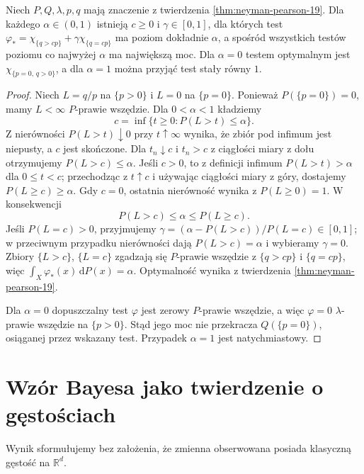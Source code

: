 \begin{wniosek}
\label{cor:NP-exact-alpha-19}
Niech $P,Q,\lambda,p,q$ mają znaczenie z twierdzenia
\ref{thm:neyman-pearson-19}. Dla każdego
$\alpha\in(0,1)$ istnieją $c\ge0$ i
$\gamma\in[0,1]$, dla których test
$\varphi_*=\chi_{\{q>cp\}}+\gamma\chi_{\{q=cp\}}$
ma poziom dokładnie $\alpha$, a spośród wszystkich
testów poziomu co najwyżej $\alpha$ ma największą moc.
Dla $\alpha=0$ testem optymalnym jest
$\chi_{\{p=0,\,q>0\}}$, a dla $\alpha=1$
można przyjąć test stały równy $1$.
\end{wniosek}
\begin{proof}
Niech $L=q/p$ na $\{p>0\}$ i $L=0$ na $\{p=0\}$.
Ponieważ $P(\{p=0\})=0$, mamy $L<\infty$
$P$-prawie wszędzie. Dla $0<\alpha<1$ kładziemy
\[
 c=\inf\{t\ge0:P(L>t)\le\alpha\}.
\]
Z nierówności $P(L>t)\downarrow0$ przy $t\uparrow\infty$
wynika, że zbiór pod infimum jest niepusty, a $c$ jest
skończone. Dla $t_n\downarrow c$ i $t_n>c$ z ciągłości
miary z dołu otrzymujemy $P(L>c)\le\alpha$.
Jeśli $c>0$, to z definicji infimum
$P(L>t)>\alpha$ dla $0\le t<c$;
przechodząc z $t\uparrow c$ i używając ciągłości miary
z góry, dostajemy $P(L\ge c)\ge\alpha$.
Gdy $c=0$, ostatnia nierówność wynika z
$P(L\ge0)=1$.
W konsekwencji
\[
 P(L>c)\le\alpha\le P(L\ge c).
\]
Jeśli $P(L=c)>0$, przyjmujemy
$\gamma=(\alpha-P(L>c))/P(L=c)\in[0,1]$;
w przeciwnym przypadku nierówności dają
$P(L>c)=\alpha$ i wybieramy $\gamma=0$.
Zbiory $\{L>c\}$, $\{L=c\}$ zgadzają się
$P$-prawie wszędzie z $\{q>cp\}$ i $\{q=cp\}$,
więc $\int_X\varphi_*(x)\,\mathrm dP(x)=\alpha$.
Optymalność wynika z twierdzenia
\ref{thm:neyman-pearson-19}.

Dla $\alpha=0$ dopuszczalny test $\varphi$ jest zerowy
$P$-prawie wszędzie, a więc $\varphi=0$
$\lambda$-prawie wszędzie na $\{p>0\}$.
Stąd jego moc nie przekracza
$Q(\{p=0\})$, osiąganej przez wskazany test.
Przypadek $\alpha=1$ jest natychmiastowy.
\end{proof}

\section{Wzór Bayesa jako twierdzenie o gęstościach}
Wynik sformułujemy bez założenia, że zmienna obserwowana
posiada klasyczną gęstość na $\mathbb R^d$.

